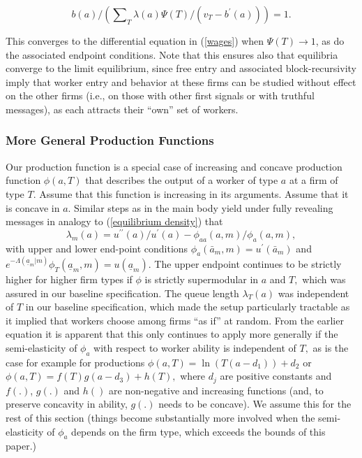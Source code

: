 \documentclass[12pt]{article}
\begin{document}
\[b(a)/\left(
\sum\nolimits_{T}\lambda (a)\Psi (T)/(v_{T}-b^{\prime }(a))\right) =1.
\]

This converges to the differential equation in (\ref{wages}) when $\Psi
(T)\longrightarrow 1$, as do the associated endpoint conditions. Note that this ensures also that equilibria converge to the limit equilibrium, since free entry and associated block-recursivity imply that worker entry and behavior at these firms can be studied without effect on the other firms (i.e., on those with other first signals or with truthful messages), as each attracts their ``own'' set of workers. 



\subsubsection{More General Production Functions}
\label{online_app:general_production}

Our production function is a
special case of increasing and concave production function $\phi (a,T)$ that describes the
output of a worker of type $a$ at a firm of type $T.$ Assume that this function is increasing in its arguments. Assume that it is concave in $a$. Similar steps as in
the main body yield under fully revealing messages in analogy to (\ref{equilibrium density}) that 
\begin{equation}\label{generalized-queue-length}
\lambda
_{m}(a)=u^{\prime \prime }(a)/u^{\prime }(a)-\phi _{aa}(a,m)/\phi _{a}(a,m),
\end{equation}
with upper and lower end-point conditions $\phi _{a}(\bar{a}%
_{m},m)=u^{\prime }(\bar{a}_{m})$ and $e^{-\Lambda (\underline{a}
_{m}|m)} \phi_{T}(\underline{a}_{m},m) = u(\underline{a}_{m}).$ The upper
endpoint continues to be strictly higher for higher firm types if $\phi $ is
strictly supermodular in $a$ and $T,$ which was assured in our baseline
specification. The queue length $\lambda _{T}(a)$ was independent of $T$ in
our baseline specification, which made the setup particularly tractable as
it implied that workers choose among firms ``as if'' at random. From the
earlier equation it is apparent that this only continues to apply more
generally if the semi-elasticity of $\phi _{a}$ with respect to worker
ability is independent of $T,$ as is the case for example for productions $ 
\phi(a,T)=\ln (T(a-d_1))+d_2$ or $
\phi(a,T)=f(T)g(a-d_3)+h(T),$
where $d_j$ are
positive constants and $f(.)$, $g(.)$ and $h()$ are non-negative and
increasing functions (and, to preserve concavity in ability, $g(.)$ needs to be concave). We assume this for the rest of this section (things become substantially more involved when the semi-elasticity of $\phi
_{a}$ depends on the firm type, which exceeds the bounds of this paper.) 
\end{document}
